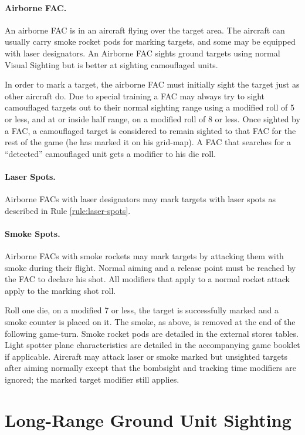 \begin{advancedrules}
\paragraph{Airborne FAC.} An airborne FAC is in an aircraft flying over the target area. The aircraft can usually carry smoke rocket pods for marking targets, and some may be equipped with laser designators. An Airborne FAC sights ground targets using normal Visual Sighting but is better at sighting camouflaged units.

In order to mark a target, the airborne FAC must initially sight the target just as other aircraft do. Due to special training a FAC may always try to sight camouflaged targets out to their normal sighting range using a modified roll of 5 or less, and at or inside half range, on a modified roll of 8 or less. Once sighted by a FAC, a camouflaged target is considered to remain sighted to that FAC for the rest of the game (he has marked it on his grid-map). A FAC that searches for a “detected” camouflaged unit gets a  modifier to his die roll.

\paragraph{Laser Spots.} Airborne FACs with laser designators may mark targets with laser spots as described in Rule \ref{rule:laser-spots}.

\paragraph{Smoke Spots.} Airborne FACs with smoke rockets may mark targets by attacking them with smoke during their flight. Normal aiming and a release point must be reached by the FAC to declare his shot. All modifiers that apply to a normal rocket attack apply to the marking shot roll.

Roll one die, on a modified 7 or less, the target is successfully marked and a smoke counter is placed on it. The smoke, as above, is removed at the end of the following game-turn. Smoke rocket pods are detailed in the external stores tables. Light spotter plane characteristics are detailed in the accompanying game booklet if applicable. Aircraft may attack laser or smoke marked but unsighted targets after aiming normally except that the bombsight and tracking time modifiers are ignored; the marked target modifier still applies.

\section{Long-Range Ground Unit Sighting}


\end{advancedrules}
